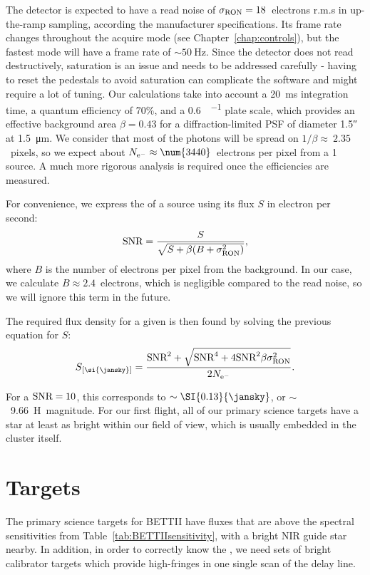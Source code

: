 The detector is expected to have a read noise of $\sigma_\textrm{RON} = 18$~electrons r.m.s in up-the-ramp sampling, according the manufacturer specifications. Its frame rate changes throughout the acquire mode (see Chapter~\ref{chap:controls}), but the fastest mode will have a frame rate of $\sim\SI{50}{\hertz}$. Since the detector does not read destructively, saturation is an issue and needs to be addressed carefully - having to reset the pedestals to avoid saturation can complicate the software and might require a lot of tuning. Our calculations take into account a \SI{20}{\milli\second} integration time, a quantum efficiency of 70\%, and a \SI{0.6}{\arcsec\per\pixel} plate scale, which provides an effective background area $\beta = 0.43$ for a diffraction-limited PSF of diameter \ang{;;1.5} at \SI{1.5}{\micro\meter}. We consider that most of the photons will be spread on $1/\beta\approx~2.35$~pixels, so we expect about $\Nel\approx\num{3440}$~electrons per pixel from a \SI{1}{\jansky} source. A much more rigorous analysis is required once the efficiencies are measured.

For convenience, we express the \SNR of a source using its flux $S$ in electron per second:
\begin{align}
\textrm{SNR} = \frac{S}{\sqrt{S + \beta(B + \sigma_\textrm{RON}^2)}},
\end{align}
where $B$ is the number of electrons per pixel from the background. In our case, we calculate $B\approx 2.4$~electrons, which is negligible compared to the read noise, so we will ignore this term in the future.

The required flux density for a given \SNR is then found by solving the previous equation for $S$:
\begin{align}
S\units{\si{\jansky}} = \frac{\SNR^2 + \sqrt{\SNR^4 + 4\SNR^2\beta\sigRON^2}}{2\Nel}.
\end{align}

For a $\textrm{SNR}=10$, this corresponds to $\sim\SI{0.13}{\jansky}$, or $\sim$~9.66~H~magnitude.  For our first flight, all of our primary science targets have a star at least as bright within our field of view, which is usually embedded in the cluster itself.

\section{Targets}

The primary science targets for BETTII have fluxes that are above the spectral sensitivities from Table~\ref{tab:BETTIIsensitivity}, with a bright NIR guide star nearby. In addition, in order to correctly know the \OPD, we need sets of bright calibrator targets which provide high-\SNR fringes in one single scan of the delay line.

